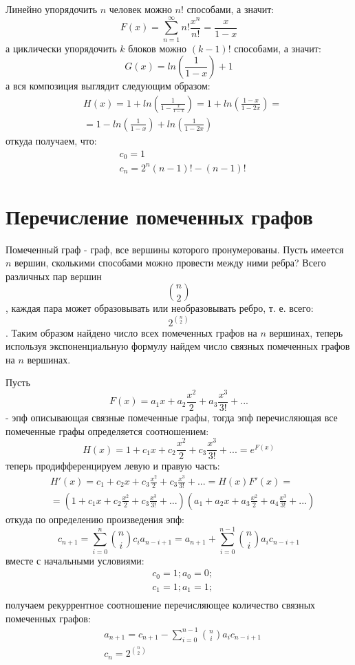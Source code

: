 Линейно упорядочить $n$ человек можно $n!$ способами, а значит:
\[
	F\left(x\right) = \sum_{n=1}^\infty n! \frac{x^n}{n!} = \frac{x}{1-x}
\]
а циклически упорядочить $k$ блоков можно $\left(k-1\right)!$ способами, а значит:
\[
	G\left(x\right) = ln\left(\frac{1}{1-x}\right) + 1
\]
а вся композиция выглядит следующим образом:
\[
	\begin{split}
		& H\left(x\right) = 1+ ln\left(\frac{1}{1-\frac{x}{1-x}}\right) = 1 + ln\left(\frac{1-x}{1-2x}\right) = \\
		& = 1 - ln\left(\frac{1}{1-x}\right) + ln\left(\frac{1}{1-2x}\right)
	\end{split}
\]
откуда получаем, что:
\[
	\begin{split}
		& c_0 = 1 \\
		& c_n = 2^n\left(n-1\right)! - \left(n-1\right)!
	\end{split}
\]

\section{Перечисление помеченных графов}

Помеченный граф - граф, все вершины которого пронумерованы. Пусть имеется $n$ вершин, сколькими способами можно провести между ними ребра? Всего различных пар вершин $$ \binom{n}{2} $$, каждая пара может образовывать или необразовывать ребро, т. е. всего: $$ 2^{\binom{n}{2}} $$. Таким образом найдено число всех помеченных графов на $n$ вершинах, теперь используя экспоненциальную формулу найдем число связных помеченных графов на $n$ вершинах.

Пусть
\[
	F\left(x\right) = a_1 x + a_2\frac{x^2}{2} + a_3 \frac{x^3}{3!} + ...
\]
- эпф описывающая связные помеченные графы, тогда эпф перечисляющая все помеченные графы определяется соотношением:
\[
	H\left(x\right) = 1 + c_1 x + c_2 \frac{x^2}{2} + c_3 \frac{x^3}{3!} + ... = e^{F\left(x\right)}
\]
теперь продифференцируем левую и правую часть:
\[
	\begin{split}
		& H'\left(x\right) = c_1 + c_2 x + c_3 \frac{x^2}{2} + c_3\frac{x^3}{3!} + ... = H\left(x\right)F'\left(x\right) = \\
		& = \left(1 + c_1 x + c_2 \frac{x^2}{2} + c_3 \frac{x^3}{3! } + ... \right)\left(a_1 + a_2 x + a_3 \frac{x^2}{2} + a_4 \frac{x^3}{3!} + ... \right)
	\end{split}
\]
откуда по определению произведения эпф:
\[
	c_{n+1} = \sum_{i=0}^{n}\binom{n}{i} c_i a_{n-i+1} = a_{n+1} + \sum_{i=0}^{n-1} \binom{n}{i} a_i c_{n-i+1}
\]
вместе с начальными условиями:
\[
	\begin{split}
		& c_0 = 1; a_0 = 0;\\
		& c_1 = 1; a_1 = 1;\\
	\end{split}
\]
получаем рекуррентное соотношение перечисляющее количество связных помеченных графов:
\begin{equation}
	\begin{split}
		& a_{n+1} = c_{n+1} - \sum_{i=0}^{n-1} \binom{n}{i} a_i c_{n-i+1} \\
		& c_n = 2^{\binom{n}{2}}
	\end{split}
\end{equation}

